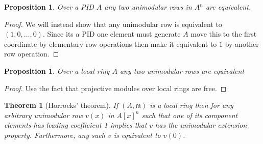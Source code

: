 \documentclass[12pt]{article}
\numberwithin{equation}{section}
\newcounter{dummy} \numberwithin{dummy}{section}
\newtheorem{theorem}[dummy]{Theorem}
\newtheorem{proposition}[dummy]{Proposition}
\begin{document}
	\begin{proposition}\label{inductionbaseforprequillensuslin}
		Over a PID $A$ any two unimodular rows in $A^n$ are equivalent.
	\end{proposition}
	\begin{proof}
		We will instead show that any unimodular row is equivalent to $(1,0,\dots, 0)$. Since its a PID one element must generate $A$ move this to the first coordinate by elementary row operations then make it equivalent to $1$ by another row operation.
	\end{proof}
	\begin{proposition}
		Over a local ring $A$ any two unimodular rows are equivalent
	\end{proposition}
	\begin{proof}
		Use the fact that projective modules over local rings are free.
	\end{proof}
	\begin{theorem}[Horrocks' theorem]
	If $(A, \mathfrak{m})$ is a local ring then for any arbitrary unimodular row $v(x)$ in $A[x]^n$ such that one of its component elements has leading coefficient 1 implies that $v$ has the unimodular extension property. Furthermore, any such $v$ is equivalent to $v(0)$.
	\end{theorem}
\end{document}
